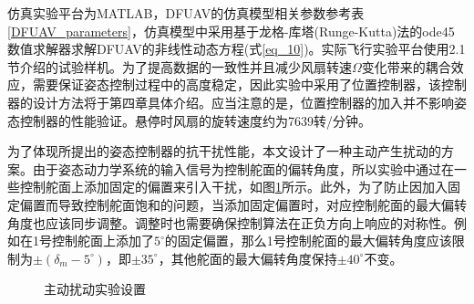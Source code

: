 仿真实验平台为MATLAB，DFUAV的仿真模型相关参数参考表\ref{DFUAV_parameters}，仿真模型中采用基于龙格-库塔(Runge-Kutta)法的ode45数值求解器求解DFUAV的非线性动态方程(式\eqref{eq_10})。实际飞行实验平台使用2.1节介绍的试验样机。为了提高数据的一致性并且减少风扇转速$\Omega$变化带来的耦合效应，需要保证姿态控制过程中的高度稳定，因此实验中采用了位置控制器，该控制器的设计方法将于第四章具体介绍。应当注意的是，位置控制器的加入并不影响姿态控制器的性能验证。悬停时风扇的旋转速度约为7639转/分钟。

为了体现所提出的姿态控制器的抗干扰性能，本文设计了一种主动产生扰动的方案。由于姿态动力学系统的输入信号为控制舵面的偏转角度，所以实验中通过在一些控制舵面上添加固定的偏置来引入干扰，如图\ref{主动扰动}所示。此外，为了防止因加入固定偏置而导致控制舵面饱和的问题，当添加固定偏置时，对应控制舵面的最大偏转角度也应该同步调整。调整时也需要确保控制算法在正负方向上响应的对称性。例如在1号控制舵面上添加了$5^{\circ}$的固定偏置，那么1号控制舵面的最大偏转角度应该限制为$\pm(\delta_m-5^{\circ})$，即$\pm35^{\circ}$，其他舵面的最大偏转角度保持$\pm40^{\circ}$不变。

\begin{figure}[htbp]
	\centering
    \caption{主动扰动实验设置}\label{主动扰动}
\end{figure}

